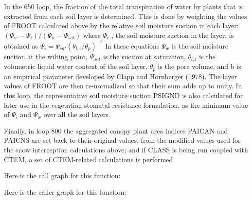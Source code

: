 In the 650 loop, the fraction of the total transpiration of water by plants that is extracted from each soil layer is determined. This is done by weighting the values of F\+R\+O\+O\+T calculated above by the relative soil moisture suction in each layer\+: $( \Psi_w - \Psi_i )/( \Psi_w - \Psi_{sat} )$ where $\Psi_i$ , the soil moisture suction in the layer, is obtained as $\Psi_i = \Psi_{sat} ( \theta_{l,i} / \theta_p )^{-b}$ In these equations $\Psi_w$ is the soil moisture suction at the wilting point, $\Psi_{sat}$ is the suction at saturation, $\theta_{l,i}$ is the volumetric liquid water content of the soil layer, $\theta_p$ is the pore volume, and b is an empirical parameter developed by Clapp and Hornberger (1978). The layer values of F\+R\+O\+O\+T are then re-\/normalized so that their sum adds up to unity. In this loop, the representative soil moisture suction P\+S\+I\+G\+N\+D is also calculated for later use in the vegetation stomatal resistance formulation, as the minimum value of $\Psi_i$ and $\Psi_w$ over all the soil layers.

Finally, in loop 800 the aggregated canopy plant area indices P\+A\+I\+C\+A\+N and P\+A\+I\+C\+N\+S are set back to their original values, from the modified values used for the snow interception calculations above; and if C\+L\+A\+S\+S is being run coupled with C\+T\+E\+M, a set of C\+T\+E\+M-\/related calculations is performed.

Here is the call graph for this function\+:




Here is the caller graph for this function\+:


